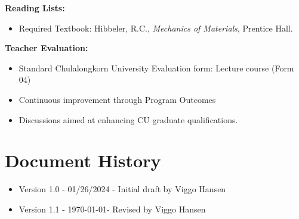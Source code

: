\documentclass[12pt]{article}
\begin{document}
\begin{enumerate}
\textbf{Reading Lists:}
\begin{itemize}
    \item Required Textbook: Hibbeler, R.C., \textit{Mechanics of Materials}, Prentice Hall.
\end{itemize}

\textbf{Teacher Evaluation:}
\begin{itemize}
    \item Standard Chulalongkorn University Evaluation form: Lecture course (Form 04)
    \item Continuous improvement through Program Outcomes
    \item Discussions aimed at enhancing CU graduate qualifications.
\end{itemize}
\end{enumerate}

\section*{Document History}
\begin{itemize}
    \item Version 1.0 - 01/26/2024 - Initial draft by Viggo Hansen
    \item Version 1.1 - \today - Revised by Viggo Hansen
\end{itemize}
\end{document}
